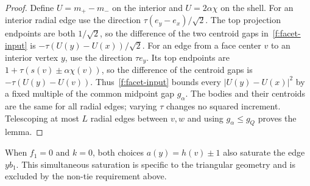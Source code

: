 \begin{proof}
Define $U=m_+-m_-$ on the interior and $U=2\alpha\chi$ on the shell.
For an interior radial edge use the direction
$\tau(e_y-e_x)/\sqrt2$. The top projection endpoints are both $1/\sqrt2$,
so the difference of the two centroid gaps in~\eqref{f:facet-input} is
$-\tau(U(y)-U(x))/\sqrt2$. For an edge from a face center $v$ to an
interior vertex $y$, use the direction $\tau e_y$. Its top endpoints are
$1+\tau(s(v)\pm\alpha\chi(v))$, so the difference of the centroid gaps
is $-\tau(U(y)-U(v))$. Thus~\eqref{f:facet-input} bounds every
$|U(y)-U(x)|^2$ by a fixed multiple of the common midpoint gap $g_\alpha$.
The bodies and their centroids are the same for all radial edges; varying
$\tau$ changes no squared increment. Telescoping at most $L$ radial edges
between $v,w$ and using $g_\alpha\le g_Q$ proves the lemma.
\end{proof}

When $f_1=0$ and $k=0$, both choices $a(y)=h(v)\pm1$ also saturate the
edge $yb_1$. This simultaneous saturation is specific to the triangular
geometry and is excluded by the non-tie requirement above.

